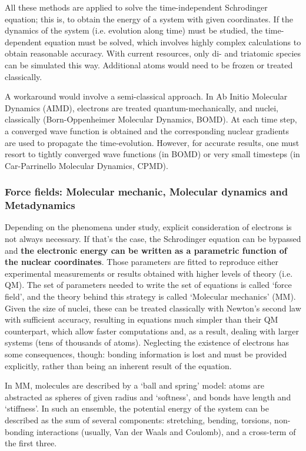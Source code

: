 All these methods are applied to solve the time-independent Schrodinger equation; this is, to obtain the energy of a system with given coordinates. If the dynamics of the system (i.e. evolution along time) must be studied, the time-dependent equation must be solved, which involves highly complex calculations to obtain reasonable accuracy. With current resources, only di- and triatomic species can be simulated this way. Additional atoms would need to be frozen or treated classically.

A workaround would involve a semi-classical approach. In Ab Initio Molecular Dynamics (AIMD), electrons are treated quantum-mechanically, and nuclei, classically (Born-Oppenheimer Molecular Dynamics, BOMD). At each time step, a converged wave function is obtained and the corresponding nuclear gradients are used to propagate the time-evolution. However, for accurate results, one must resort to tightly converged wave functions (in BOMD) or very small timesteps (in Car-Parrinello Molecular Dynamics, CPMD).

\subsubsection{Force fields: Molecular mechanic, Molecular dynamics and Metadynamics}
Depending on the phenomena under study, explicit consideration of electrons is not always necessary. If that’s the case, the Schrodinger equation can be bypassed and \textbf{the electronic energy can be written as a parametric function of the nuclear coordinates}. Those parameters are fitted to reproduce either experimental measurements or results obtained with higher levels of theory (i.e. QM). The set of parameters needed to write the set of equations is called ‘force field’, and the theory behind this strategy is called ‘Molecular mechanics’ (MM). Given the size of nuclei, these can be treated classically with Newton’s second law with sufficient accuracy, resulting in equations much simpler than their QM counterpart, which allow faster computations and, as a result, dealing with larger systems (tens of thousands of atoms). Neglecting the existence of electrons has some consequences, though: bonding information is lost and must be provided explicitly, rather than being an inherent result of the equation.

In MM, molecules are described by a ‘ball and spring’ model: atoms are abstracted as spheres of given radius and ‘softness’, and bonds have length and ‘stiffness’. In such an ensemble, the potential energy of the system can be described as the sum of several components: stretching, bending, torsions, non-bonding interactions (usually, Van der Waals and Coulomb), and a cross-term of the first three.


